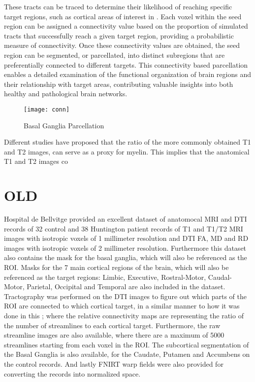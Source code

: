 These tracts can be traced to determine their likelihood of reaching specific target regions, such as cortical areas of interest in . Each voxel within the seed region can be assigned a connectivity value based on the proportion of simulated tracts that successfully reach a given target region, providing a probabilistic measure of connectivity. Once these connectivity values are obtained, the seed region can be segmented, or parcellated, into distinct subregions that are preferentially connected to different targets. This connectivity based parcellation enables a detailed examination of the functional organization of brain regions and their relationship with target areas, contributing valuable insights into both healthy and pathological brain networks.
\begin{figure}[H]
\centering
\texttt{[image: conn]}
\caption{Basal Ganglia Parcellation}
\label{fig:conn}
\end{figure}
Different studies have proposed that the ratio of the more commonly obtained T1 and T2 images, can serve as a proxy for myelin. This implies that the anatomical T1 and T2 images co









\chapter{OLD}

Hospital de Bellvitge provided an excellent dataset of anatomocal \ac{MRI} and \ac{DTI} records of 32 control and 38 Huntington patient records of T1 and T1/T2 \ac{MRI} images with isotropic voxels of 1 millimeter resolution and \ac{DTI} \ac{FA}, \ac{MD} and \ac{RD} images with isotropic voxels of 2 millimeter resolution. Furthermore this dataset also contains the mask for the basal ganglia, which will also be referenced as the \ac{ROI}. Masks for the 7 main cortical regions of the brain, which will also be referenced as the target regions: Limbic, Executive, Rostral-Motor, Caudal-Motor, Parietal, Occipital and Temporal are also included in the dataset. Tractography was performed on the \ac{DTI} images to figure out which parts of the \ac{ROI} are connected to which cortical target, in a similar manner to how it was done in this ; where the relative connectivity maps are representing the ratio of the number of streamlines to each cortical target. Furthermore, the raw streamline images are also available, where there are a maximum of 5000 streamlines starting from each voxel in the \ac{ROI}. The subcortical segmentation of the Basal Ganglia is also available, for the Caudate, Putamen and Accumbens on the control records. And lastly \ac{FNIRT} warp fields were also provided for converting the records into normalized space.\par




